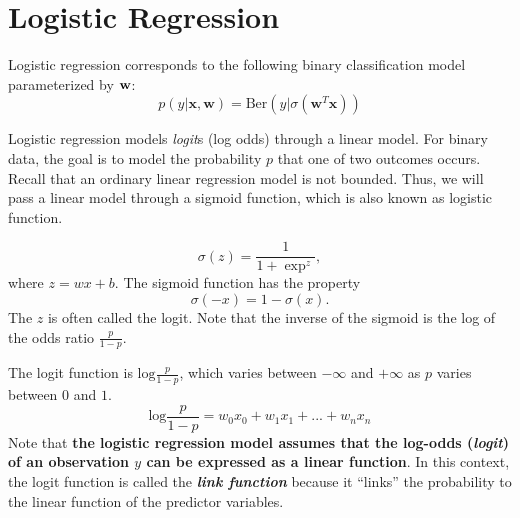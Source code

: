 \section{Logistic Regression}
\label{sec:logistic_regression}

Logistic regression corresponds to the following binary classification model parameterized by ${\mathbf{w}}$:
$$p(y|\mathbf{x},\mathbf{w})=\textrm{Ber}(y|\sigma(\mathbf{w}^T\mathbf{x}))$$

Logistic regression models \textit{logit}s (log odds) through a linear model. For binary data, the goal is to model the probability $p$ that one of two outcomes occurs. Recall that an ordinary linear regression model is not bounded. Thus, we will pass a linear model through a sigmoid function, which is also known as logistic function. 

$$\sigma(z) = \frac{1}{1+\exp^{z}},$$
where $z=wx+b.$
The sigmoid function has the property
$$\sigma(-x) = 1-\sigma(x).$$
The $z$ is often called the logit. Note that the inverse of the sigmoid is the log of the odds ratio $\frac{p}{1-p}.$

The logit function is $\textrm{log}\frac{p}{1-p}$, which varies between $-\infty$ and $+\infty$ as $p$ varies between $0$ and $1$.
$$\textrm{log}\frac{p}{1-p} = w_0x_0 +  w_1x_1 + ... + w_nx_n$$
Note that \textbf{the logistic regression model assumes that the log-odds (\textit{logit}) of an observation $y$ can be expressed as a linear function}. In this context, the logit function is called the \textbf{\textit{link function}} because it ``links'' the probability to the linear function of the predictor variables.



